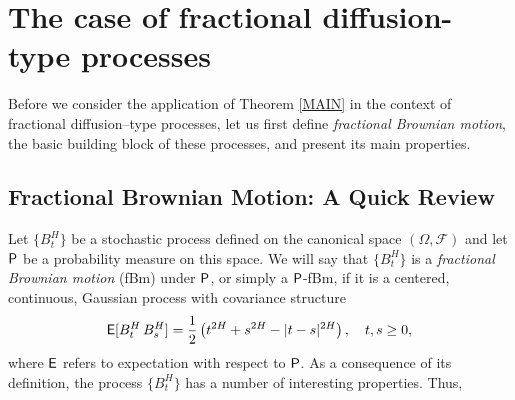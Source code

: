 \documentclass[11pt,reqno]{amsart}
\theoremstyle{remark}
\begin{document}
\section{The case of fractional diffusion-type processes}
Before we consider the application of Theorem \ref{MAIN} in the context of fractional diffusion--type processes, 
let us first define \textit{fractional Brownian motion}, the basic building block of these processes,  and present its main properties. 

\subsection{Fractional Brownian Motion: A Quick Review} 
Let $\{B_{t}^{H}\}$ be a stochastic process defined on the canonical space $(\Omega, {\mathcal{F}})$ and  let ${{\sf P}}$ be a probability measure on this space. 
We will say that  $\{B_{t}^{H}\}$ is a \textit{fractional Brownian motion} (fBm) under ${{\sf P}}$, or simply a ${{\sf P}}$-fBm, if it is a centered, continuous, Gaussian process  with covariance structure 
\begin{equation*} 
{{\sf E}} [B^{H}_{t} \, B_{s}^{H}] = \frac{1}{2} \left( t^{2H} + s^{2H} -|t-s|^{2H} \right), \quad t,s \geq 0,
\end{equation*} 
where ${{\sf E}}$ refers to expectation with respect to ${{\sf P}}$. As a consequence of its definition, the process $\{B_{t}^{H}\}$ has a number of interesting properties. Thus, 
\end{document}
